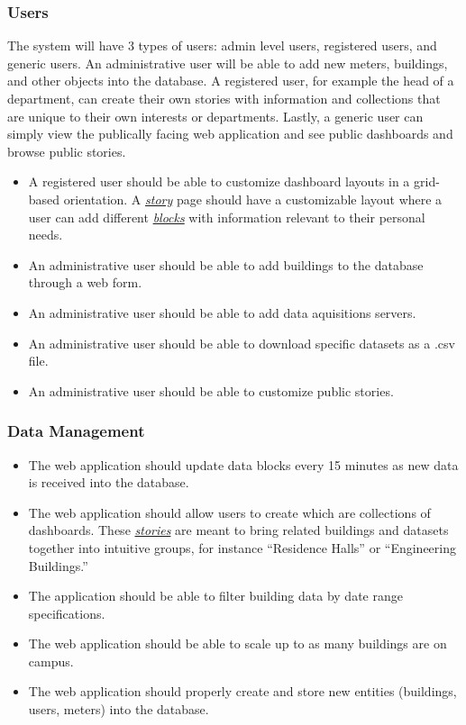\documentclass[onecolumn, draftclsnofoot,10pt, compsoc]{IEEEtran}
\begin{document}
\begin{enumerate}
    \subsubsection{Users}
    The system will have 3 types of users: admin level users, registered users, and generic users. An administrative user will be able to add new meters, buildings, and other objects into the database. A registered user, for example the head of a department, can create their own stories with information and collections that are unique to their own interests or departments. Lastly, a generic user can simply view the publically facing web application and see public dashboards and browse public stories. 
    \begin{itemize}
        \item A registered user should be able to customize dashboard layouts in a grid-based orientation. A \hyperref[definition]{\textit{story}} page should have a customizable layout where a user can add different \hyperref[definition]{\textit{blocks}} with information relevant to their personal needs.
        \item An administrative user should be able to add buildings to the database through a web form.
        \item An administrative user should be able to add data aquisitions servers.
        \item An administrative user should be able to download specific datasets as a .csv file.
        \item An administrative user should be able to customize public stories.
    \end{itemize}

    \subsubsection{Data Management}
    \begin{itemize}
        \item The web application should update data blocks every 15 minutes as new data is received into the database.
        \item The web application should allow users to create  which are collections of dashboards. These 
        \hyperref[definition]{\textit{stories}} are meant to bring related buildings and datasets together into intuitive groups, for instance ``Residence Halls'' or ``Engineering Buildings.''
        \item The application should be able to filter building data by date range specifications.
        \item The web application should be able to scale up to as many buildings are on campus.
        \item The web application should properly create and store new entities (buildings, users, meters) into the database.
        

\end{itemize}
\end{enumerate}
\end{document}
